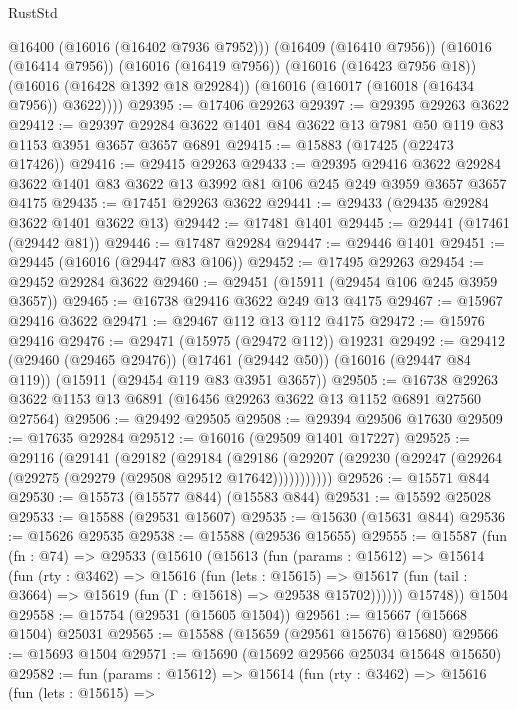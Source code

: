 \begin{lexlean}{RustStd}
\begin{coremodule}
          @16400
          (@16016 (@16402 @7936 @7952)))
        (@16409 (@16410 @7956))
        (@16016 (@16414 @7956))
        (@16016 (@16419 @7956))
        (@16016 (@16423 @7956 @18))
        (@16016 (@16428 @1392 @18 @29284))
        (@16016 (@16017 (@16018 (@16434 @7956)) @3622))))
@29395 := @17406 @29263
@29397 := @29395 @29263 @3622
@29412 := @29397 @29284 @3622 @1401 @84 @3622 @13 @7981 @50 @119 @83 @1153 @3951 @3657 @3657 @6891
@29415 := @15883 (@17425 (@22473 @17426))
@29416 := @29415 @29263
@29433 := @29395
    @29416
    @3622
    @29284
    @3622
    @1401
    @83
    @3622
    @13
    @3992
    @81
    @106
    @245
    @249
    @3959
    @3657
    @3657
    @4175
@29435 := @17451 @29263 @3622
@29441 := @29433 (@29435 @29284 @3622 @1401 @3622 @13)
@29442 := @17481 @1401
@29445 := @29441 (@17461 (@29442 @81))
@29446 := @17487 @29284
@29447 := @29446 @1401
@29451 := @29445 (@16016 (@29447 @83 @106))
@29452 := @17495 @29263
@29454 := @29452 @29284 @3622
@29460 := @29451 (@15911 (@29454 @106 @245 @3959 @3657))
@29465 := @16738 @29416 @3622 @249 @13 @4175
@29467 := @15967 @29416 @3622
@29471 := @29467 @112 @13 @112 @4175
@29472 := @15976 @29416
@29476 := @29471 (@15975 (@29472 @112)) @19231
@29492 := @29412
    (@29460 (@29465 @29476))
    (@17461 (@29442 @50))
    (@16016 (@29447 @84 @119))
    (@15911 (@29454 @119 @83 @3951 @3657))
@29505 := @16738 @29263 @3622 @1153 @13 @6891 (@16456 @29263 @3622 @13 @1152 @6891 @27560 @27564)
@29506 := @29492 @29505
@29508 := @29394 @29506 @17630
@29509 := @17635 @29284
@29512 := @16016 (@29509 @1401 @17227)
@29525 := @29116
    (@29141
      (@29182
        (@29184
          (@29186 (@29207 (@29230 (@29247 (@29264 (@29275 (@29279 (@29508 @29512 @17642)))))))))))
@29526 := @15571 @844
@29530 := @15573 (@15577 @844) (@15583 @844)
@29531 := @15592 @25028
@29533 := @15588 (@29531 @15607)
@29535 := @15630 (@15631 @844)
@29536 := @15626 @29535
@29538 := @15588 (@29536 @15655)
@29555 := @15587
    (fun (fn : @74) =>
    @29533
      (@15610
        (@15613
          (fun (params : @15612) =>
          @15614
            (fun (rty : @3462) =>
            @15616
              (fun (lets : @15615) =>
              @15617 (fun (tail : @3664) => @15619 (fun (Γ : @15618) => @29538 @15702))))))
        @15748))
    @1504
@29558 := @15754 (@29531 (@15605 @1504))
@29561 := @15667 (@15668 @1504) @25031
@29565 := @15588 (@15659 (@29561 @15676) @15680)
@29566 := @15693 @1504
@29571 := @15690 (@15692 @29566 @25034 @15648 @15650)
@29582 := fun (params : @15612) =>
  @15614
    (fun (rty : @3462) =>
    @15616
      (fun (lets : @15615) =>

\end{coremodule}
\end{lexlean}
